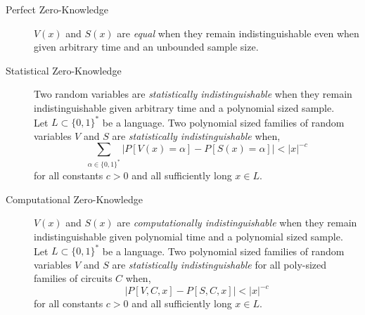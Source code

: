 \begin{description}
	\item[Perfect Zero-Knowledge]
	$V(x)$ and $S(x)$ are \textit{equal} when they remain indistinguishable even when given arbitrary time and an unbounded sample size.
	
	\item[Statistical Zero-Knowledge] Two random variables are \textit{statistically indistinguishable} when they remain indistinguishable given arbitrary time and a polynomial sized sample.
	\bigskip
	\\
	Let $L \subset \{0,1\}^*$ be a language. Two polynomial sized families of random variables $V$ and $S$ are \textit{statistically indistinguishable} when,
	$$\sum_{\alpha \in \{0,1\}^*} |P[V(x) = \alpha] - P[S(x) = \alpha]| < |x|^{-c}$$
	for all constants $c>0$ and all sufficiently long $x \in L$.
	
	\item[Computational Zero-Knowledge] $V(x)$ and $S(x)$ are \textit{computationally indistinguishable} when they remain indistinguishable given polynomial time and a polynomial sized sample.
	\bigskip
	\\
	Let $L \subset \{0,1\}^*$ be a language. Two polynomial sized families of random variables $V$ and $S$ are \textit{statistically indistinguishable} for all poly-sized families of circuits $C$ when,
	$$|P[V, C, x] - P[S, C, x]| < |x|^{-c}$$
	for all constants $c>0$ and all sufficiently long $x \in L$.

\end{description}


